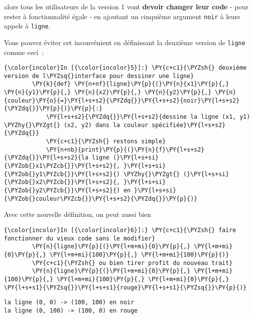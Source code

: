 alors tous les utilisateurs de la version 1 vont \textbf{devoir changer
leur code} - pour rester à fonctionnalité égale - en ajoutant un
cinquième argument \texttt{\textquotesingle{}noir\textquotesingle{}} à
leurs appels à \texttt{ligne}.

    Vous pouvez éviter cet inconvénient en définissant la deuxième version
de \texttt{ligne} comme ceci~:

    \begin{Verbatim}[commandchars=\\\{\},frame=single,framerule=0.3mm,rulecolor=\color{cellframecolor}]
{\color{incolor}In [{\color{incolor}5}]:} \PY{c+c1}{\PYZsh{} deuxième version de l\PYZsq{}interface pour dessiner une ligne}
        \PY{k}{def} \PY{n+nf}{ligne}\PY{p}{(}\PY{n}{x1}\PY{p}{,} \PY{n}{y1}\PY{p}{,} \PY{n}{x2}\PY{p}{,} \PY{n}{y2}\PY{p}{,} \PY{n}{couleur}\PY{o}{=}\PY{l+s+s2}{\PYZdq{}}\PY{l+s+s2}{noir}\PY{l+s+s2}{\PYZdq{}}\PY{p}{)}\PY{p}{:}
            \PY{l+s+s2}{\PYZdq{}}\PY{l+s+s2}{dessine la ligne (x1, y1) \PYZhy{}\PYZgt{} (x2, y2) dans la couleur spécifiée}\PY{l+s+s2}{\PYZdq{}}
            \PY{c+c1}{\PYZsh{} restons simple}
            \PY{n+nb}{print}\PY{p}{(}\PY{n}{f}\PY{l+s+s2}{\PYZdq{}}\PY{l+s+s2}{la ligne (}\PY{l+s+si}{\PYZob{}x1\PYZcb{}}\PY{l+s+s2}{, }\PY{l+s+si}{\PYZob{}y1\PYZcb{}}\PY{l+s+s2}{) \PYZhy{}\PYZgt{} (}\PY{l+s+si}{\PYZob{}x2\PYZcb{}}\PY{l+s+s2}{, }\PY{l+s+si}{\PYZob{}y2\PYZcb{}}\PY{l+s+s2}{) en }\PY{l+s+si}{\PYZob{}couleur\PYZcb{}}\PY{l+s+s2}{\PYZdq{}}\PY{p}{)}
\end{Verbatim}


    Avec cette nouvelle définition, on peut aussi bien

    \begin{Verbatim}[commandchars=\\\{\},frame=single,framerule=0.3mm,rulecolor=\color{cellframecolor}]
{\color{incolor}In [{\color{incolor}6}]:} \PY{c+c1}{\PYZsh{} faire fonctionner du vieux code sans le modifier}
        \PY{n}{ligne}\PY{p}{(}\PY{l+m+mi}{0}\PY{p}{,} \PY{l+m+mi}{0}\PY{p}{,} \PY{l+m+mi}{100}\PY{p}{,} \PY{l+m+mi}{100}\PY{p}{)}
        \PY{c+c1}{\PYZsh{} ou bien tirer profit du nouveau trait}
        \PY{n}{ligne}\PY{p}{(}\PY{l+m+mi}{0}\PY{p}{,} \PY{l+m+mi}{100}\PY{p}{,} \PY{l+m+mi}{100}\PY{p}{,} \PY{l+m+mi}{0}\PY{p}{,} \PY{l+s+s1}{\PYZsq{}}\PY{l+s+s1}{rouge}\PY{l+s+s1}{\PYZsq{}}\PY{p}{)}
\end{Verbatim}


    \begin{Verbatim}[commandchars=\\\{\},frame=single,framerule=0.3mm,rulecolor=\color{cellframecolor}]
la ligne (0, 0) -> (100, 100) en noir
la ligne (0, 100) -> (100, 0) en rouge
\end{Verbatim}

